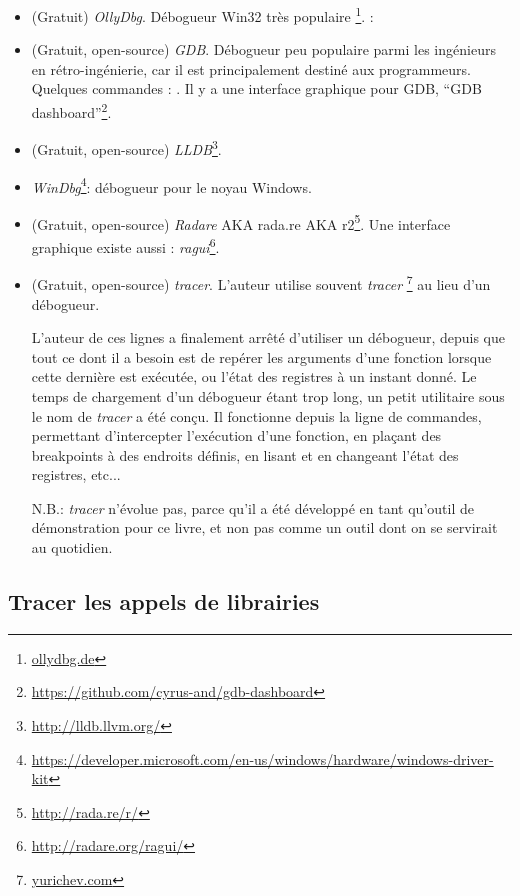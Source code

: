 \begin{itemize}
\item (Gratuit) \emph{OllyDbg}.
Débogueur Win32 très populaire \footnote{\href{http://go.yurichev.com/17032}{ollydbg.de}}.
\ShortHotKeyCheatsheet: 

\item (Gratuit, open-source) \emph{GDB}.
Débogueur peu populaire parmi les ingénieurs en rétro-ingénierie, car il est principalement destiné aux programmeurs.
Quelques commandes : .
Il y a une interface graphique pour GDB, ``GDB dashboard''\footnote{\url{https://github.com/cyrus-and/gdb-dashboard}}.

\item (Gratuit, open-source) \emph{LLDB}\footnote{\url{http://lldb.llvm.org/}}.

\item \emph{WinDbg}\footnote{\url{https://developer.microsoft.com/en-us/windows/hardware/windows-driver-kit}}:
débogueur pour le noyau Windows.

\item (Gratuit, open-source) \emph{Radare} \ac{AKA} rada.re \ac{AKA} r2\footnote{\url{http://rada.re/r/}}.
Une interface graphique existe aussi : \emph{ragui}\footnote{\url{http://radare.org/ragui/}}.

\item (Gratuit, open-source) \emph{tracer}.
\label{tracer}
L'auteur utilise souvent \emph{tracer}
\footnote{\href{http://go.yurichev.com/17338}{yurichev.com}}
au lieu d'un débogueur.

L'auteur de ces lignes a finalement arrêté d'utiliser un débogueur, depuis que tout ce dont il a besoin est de repérer les arguments d'une fonction lorsque cette dernière est exécutée, ou l'état des registres à un instant donné.
Le temps de chargement d'un débogueur étant trop long, un petit utilitaire sous le nom de \emph{tracer} a été conçu.
Il fonctionne depuis la ligne de commandes, permettant d'intercepter l'exécution d'une fonction,
en plaçant des breakpoints à des endroits définis, en lisant et en changeant l'état des registres, etc...

N.B.: \emph{tracer} n'évolue pas, parce qu'il a été développé en tant qu'outil de démonstration pour ce livre, et non pas comme un outil dont on se servirait au quotidien.
\end{itemize}

\subsection{Tracer les appels de librairies}

